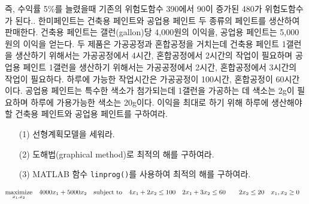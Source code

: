 \documentclass[a4,10pt]{article}
\theoremstyle{examplestyle}
\let\\\tabularnewline
\let\\\tabularnewline
\begin{document}
즉, 수익률 5\%를 늘렸을때 기존의 위험도함수 390에서 90이 증가된 480가 위험도함수가 된다.\\
4. 한미페인트는 건축용 페인트와 공업용 페인트 두 종류의 페인트를 생산하여 판매한다. 건축용 페인트는 갤런(gallon)당 4,000원의 이익을, 공업용 페인트는 5,000원의 이익을 얻는다. 두 제품은 가공공정과 혼합공정을 거치는데 건축용 페인트 1갤런을 생산하기 위해서는 가공공정에서 4시간, 혼합공정에서 2시간의 작업이 필요하며 공업용 페인트 1갤런을 생산하기 위해서는 가공공정에서 2시간, 혼합공정에서 3시간의 작업이 필요하다. 하루에 가능한 작업시간은 가공공정이 100시간, 혼합공정이 60시간이다. 공업용 페인트는 특수한 색소가 첨가되는데 1갤런을 가공하는 데 색소는 2g이 필요하며 하루에 가용가능한 색소는 20g이다. 이익을 최대로 하기 위해 하루에 생산해야 할 건축용 페인트와 공업용 페인트를 구하여라.
\begin{itemize}
\item[(1)] 선형계획모델을 세워라.
\item[(2)] 도해법(graphical method)로 최적의 해를 구하여라.
\item[(3)] MATLAB 함수 \texttt{linprog()}를 사용하여 최적의 해를 구하여라.
\end{itemize}
\begin{equation*}
\begin{aligned}
& \underset{x_{1},x_{2}}{\text{maximize}}& &4000x_{1}+5000x_{2}\\
& \text{subject to}& & 4x_{1}+2x_{2}\leq100\\
& & & 2x_{1}+3x_{2}\leq 60\\
& & & 2x_{2}\leq 20\\
& & & x_{1},x_{2}\geq0\\
\end{aligned}
\end{equation*}
\end{document}
